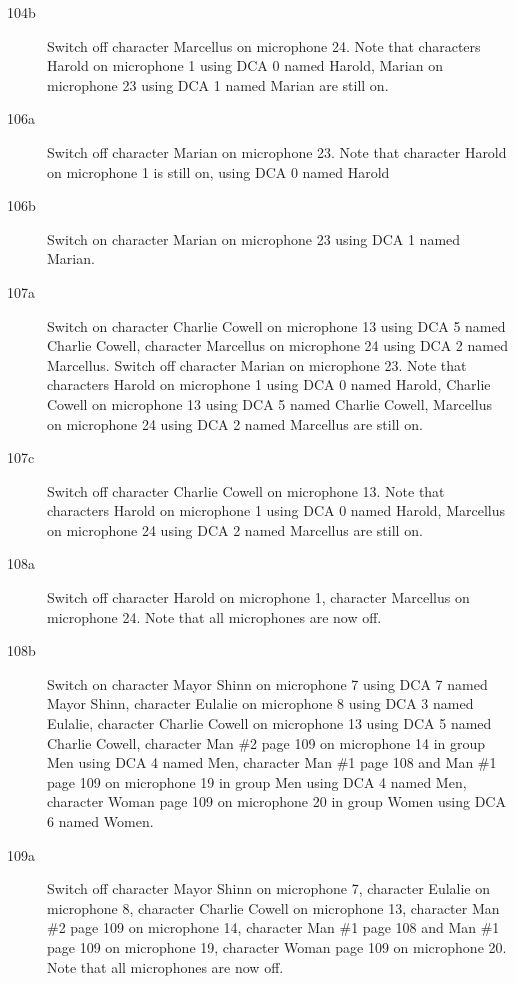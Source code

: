 \begin{description}
\item[104b]
Switch off character Marcellus on microphone 24. Note that characters Harold on microphone 1 using DCA 0 named Harold, Marian on microphone 23 using DCA 1 named Marian are still on.  

\item[106a]
Switch off character Marian on microphone 23. Note that character Harold on microphone 1 is still on, using DCA 0 named Harold

\item[106b]
Switch on character Marian on microphone 23 using DCA 1 named Marian. 

\item[107a]
Switch on character Charlie Cowell on microphone 13 using DCA 5 named Charlie Cowell, character Marcellus on microphone 24 using DCA 2 named Marcellus. Switch off character Marian on microphone 23. Note that characters Harold on microphone 1 using DCA 0 named Harold, Charlie Cowell on microphone 13 using DCA 5 named Charlie Cowell, Marcellus on microphone 24 using DCA 2 named Marcellus are still on.  

\item[107c]
Switch off character Charlie Cowell on microphone 13. Note that characters Harold on microphone 1 using DCA 0 named Harold, Marcellus on microphone 24 using DCA 2 named Marcellus are still on.  

\item[108a]
Switch off character Harold on microphone 1, character Marcellus on microphone 24. Note that all microphones are now off.

\item[108b]
Switch on character Mayor Shinn on microphone 7 using DCA 7 named Mayor Shinn, character Eulalie on microphone 8 using DCA 3 named Eulalie, character Charlie Cowell on microphone 13 using DCA 5 named Charlie Cowell, character Man \#2 page 109 on microphone 14 in group Men using DCA 4 named Men, character Man \#1 page 108 and Man \#1 page 109 on microphone 19 in group Men using DCA 4 named Men, character Woman page 109 on microphone 20 in group Women using DCA 6 named Women. 

\item[109a]
Switch off character Mayor Shinn on microphone 7, character Eulalie on microphone 8, character Charlie Cowell on microphone 13, character Man \#2 page 109 on microphone 14, character Man \#1 page 108 and Man \#1 page 109 on microphone 19, character Woman page 109 on microphone 20. Note that all microphones are now off.


\end{description}
